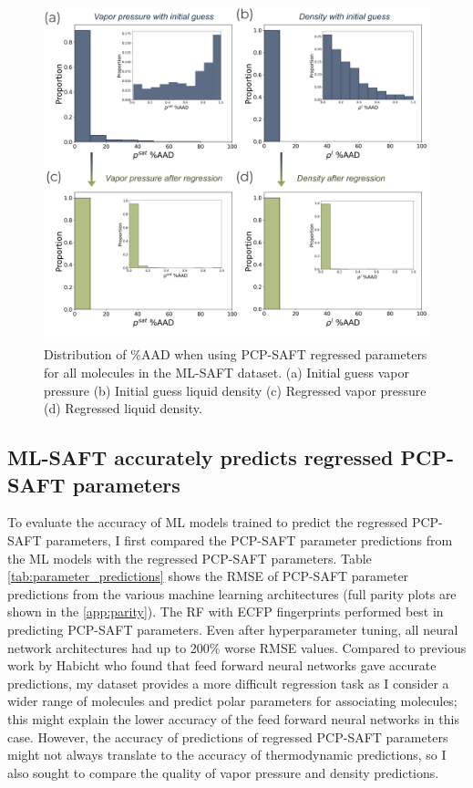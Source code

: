\begin{figure}
    \centering
    \includegraphics[width=\textwidth]{gfx/Chapter08/regression_errors.png}
    \caption{Distribution of \%AAD  when using PCP-SAFT regressed parameters for all molecules in the ML-SAFT dataset. (a) Initial guess vapor pressure (b) Initial guess liquid density (c) Regressed vapor pressure (d) Regressed liquid density.}
    \label{fig:regression_errors}
\end{figure}

\subsection{ML-SAFT accurately predicts regressed PCP-SAFT parameters}

To evaluate the accuracy of ML models trained to predict the regressed PCP-SAFT parameters, I first compared the PCP-SAFT parameter predictions from the ML models with the regressed PCP-SAFT parameters. Table \ref{tab:parameter_predictions} shows the RMSE of PCP-SAFT parameter predictions from the various machine learning architectures (full parity plots are shown in the \ref{app:parity}). The RF with ECFP fingerprints performed best in predicting PCP-SAFT parameters. Even after hyperparameter tuning, all neural network architectures had up to 200\% worse RMSE values. Compared to previous work by Habicht who found that feed forward neural networks gave accurate predictions, my dataset provides a more difficult regression task as I consider a wider range of molecules and predict polar parameters for associating molecules; this might explain the lower accuracy of the feed forward neural networks in this case. However, the accuracy of predictions of regressed PCP-SAFT parameters might not always translate to the accuracy of thermodynamic predictions, so I also sought to compare the quality of vapor pressure and density predictions.


